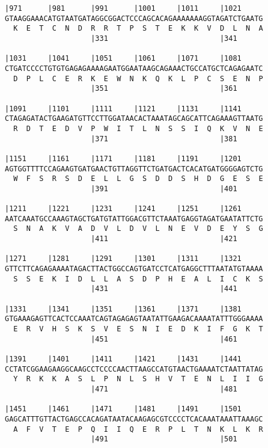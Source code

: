 \documentclass{article}
\begin{document}
\begin{Verbatim}[fontfamily=courier]
|971      |981      |991      |1001     |1011     |1021     
GTAAGGAAACATGTAATGATAGGCGGACTCCCAGCACAGAAAAAAAGGTAGATCTGAATG
  K  E  T  C  N  D  R  R  T  P  S  T  E  K  K  V  D  L  N  A
                    |331                          |341      

|1031     |1041     |1051     |1061     |1071     |1081     
CTGATCCCCTGTGTGAGAGAAAAGAATGGAATAAGCAGAAACTGCCATGCTCAGAGAATC
  D  P  L  C  E  R  K  E  W  N  K  Q  K  L  P  C  S  E  N  P
                    |351                          |361      

|1091     |1101     |1111     |1121     |1131     |1141     
CTAGAGATACTGAAGATGTTCCTTGGATAACACTAAATAGCAGCATTCAGAAAGTTAATG
  R  D  T  E  D  V  P  W  I  T  L  N  S  S  I  Q  K  V  N  E
                    |371                          |381      

|1151     |1161     |1171     |1181     |1191     |1201     
AGTGGTTTTCCAGAAGTGATGAACTGTTAGGTTCTGATGACTCACATGATGGGGAGTCTG
  W  F  S  R  S  D  E  L  L  G  S  D  D  S  H  D  G  E  S  E
                    |391                          |401      

|1211     |1221     |1231     |1241     |1251     |1261     
AATCAAATGCCAAAGTAGCTGATGTATTGGACGTTCTAAATGAGGTAGATGAATATTCTG
  S  N  A  K  V  A  D  V  L  D  V  L  N  E  V  D  E  Y  S  G
                    |411                          |421      

|1271     |1281     |1291     |1301     |1311     |1321     
GTTCTTCAGAGAAAATAGACTTACTGGCCAGTGATCCTCATGAGGCTTTAATATGTAAAA
  S  S  E  K  I  D  L  L  A  S  D  P  H  E  A  L  I  C  K  S
                    |431                          |441      

|1331     |1341     |1351     |1361     |1371     |1381     
GTGAAAGAGTTCACTCCAAATCAGTAGAGAGTAATATTGAAGACAAAATATTTGGGAAAA
  E  R  V  H  S  K  S  V  E  S  N  I  E  D  K  I  F  G  K  T
                    |451                          |461      

|1391     |1401     |1411     |1421     |1431     |1441     
CCTATCGGAAGAAGGCAAGCCTCCCCAACTTAAGCCATGTAACTGAAAATCTAATTATAG
  Y  R  K  K  A  S  L  P  N  L  S  H  V  T  E  N  L  I  I  G
                    |471                          |481      

|1451     |1461     |1471     |1481     |1491     |1501     
GAGCATTTGTTACTGAGCCACAGATAATACAAGAGCGTCCCCTCACAAATAAATTAAAGC
  A  F  V  T  E  P  Q  I  I  Q  E  R  P  L  T  N  K  L  K  R
                    |491                          |501      

\end{Verbatim}
\end{document}
